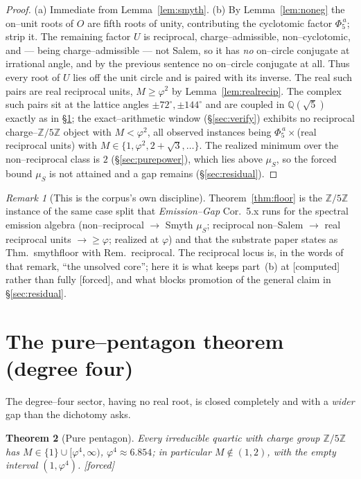 \documentclass[11pt]{article}
\newcommand{\forced}{\textcolor{cforced}{\textsf{[forced]}}}
\newcommand{\computed}{\textcolor{ccomp}{\textsf{[computed]}}}
\newcommand{\Z}{\mathbb{Z}}
\newcommand{\Q}{\mathbb{Q}}
\newcommand{\Mah}{M}
\newcommand{\muS}{\mu_S}
\newcommand{\Zfive}{\Z/5\Z}
\theoremstyle{plain}
\newtheorem{theorem}{Theorem}[section]
\theoremstyle{definition}
\theoremstyle{remark}
\newtheorem{remark}[theorem]{Remark}
\begin{document}
\begin{proof}
(a) Immediate from Lemma~\ref{lem:smyth}. (b) By Lemma~\ref{lem:noneg} the on--unit roots of $O$ are
fifth roots of unity, contributing the cyclotomic factor $\Phi_5^{\,a}$; strip it. The remaining
factor $U$ is reciprocal, charge--admissible, non--cyclotomic, and --- being charge--admissible ---
not Salem, so it has \emph{no} on--circle conjugate at irrational angle, and by the previous sentence
no on--circle conjugate at all. Thus every root of $U$ lies off the unit circle and is paired with
its inverse. The real such pairs are real reciprocal units, $\Mah\ge\varphi^2$ by
Lemma~\ref{lem:realrecip}. The complex such pairs sit at the lattice angles $\pm72^\circ,\pm144^\circ$
and are coupled in $\Q(\sqrt5)$ exactly as in \S\ref{sec:pentagon}; the exact--arithmetic window
(\S\ref{sec:verify}) exhibits no reciprocal charge--$\Zfive$ object with $\Mah<\varphi^2$, all
observed instances being $\Phi_5^{\,a}\times$(real reciprocal units) with $\Mah\in\{1,\varphi^2,
2+\sqrt3,\dots\}$. The realized minimum over the non--reciprocal class is $2$ (\S\ref{sec:purepower}),
which lies above $\muS$, so the forced bound $\muS$ is not attained and a gap remains
(\S\ref{sec:residual}).
\end{proof}

\begin{remark}[This is the corpus's own discipline]
Theorem~\ref{thm:floor} is the $\Zfive$ instance of the same case split that \emph{Emission--Gap}
Cor.~5.x runs for the spectral emission algebra (non--reciprocal $\to$ Smyth $\muS$; reciprocal
non--Salem $\to$ real reciprocal units $\to\ge\varphi$; realized at $\varphi$) and that the substrate
paper states as Thm.~\textup{smythfloor} with Rem.~\textup{reciprocal}. The reciprocal locus is, in
the words of that remark, ``the unsolved core''; here it is what keeps part~(b) at \computed{} rather
than fully \forced{}, and what blocks promotion of the general claim in \S\ref{sec:residual}.
\end{remark}

\section{The pure--pentagon theorem (degree four)}\label{sec:pentagon}

The degree--four sector, having no real root, is closed completely and with a \emph{wider} gap than
the dichotomy asks.

\begin{theorem}[Pure pentagon]\label{thm:pentagon}
Every irreducible quartic with charge group $\Zfive$ has $\Mah\in\{1\}\cup[\varphi^4,\infty)$,
$\varphi^4\approx6.854$; in particular $\Mah\notin(1,2)$, with the empty interval $(1,\varphi^4)$.
\forced{}
\end{theorem}
\end{document}
